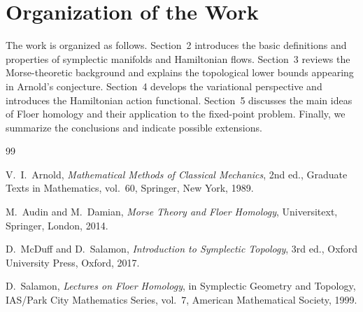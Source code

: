 \documentclass[11pt,a4paper]{article}
\theoremstyle{plain}
\theoremstyle{definition}
\theoremstyle{remark}
\begin{document}
	\section{Organization of the Work}
	
	The work is organized as follows. Section~2 introduces
	the basic definitions and properties of symplectic
	manifolds and Hamiltonian flows. Section~3 reviews the
	Morse-theoretic background and explains the topological
	lower bounds appearing in Arnold's conjecture. Section~4
	develops the variational perspective and introduces the
	Hamiltonian action functional. Section~5 discusses the
	main ideas of Floer homology and their application to
	the fixed-point problem. Finally, we summarize the
	conclusions and indicate possible extensions.
	
	\begin{thebibliography}{99}
		
		V.~I.~Arnold,
		\emph{Mathematical Methods of Classical Mechanics},
		2nd ed., Graduate Texts in Mathematics, vol.~60,
		Springer, New York, 1989.
		
		M.~Audin and M.~Damian,
		\emph{Morse Theory and Floer Homology},
		Universitext, Springer, London, 2014.
		
		D.~McDuff and D.~Salamon,
		\emph{Introduction to Symplectic Topology},
		3rd ed., Oxford University Press, Oxford, 2017.
		
		D.~Salamon,
		\emph{Lectures on Floer Homology},
		in Symplectic Geometry and Topology,
		IAS/Park City Mathematics Series, vol.~7,
		American Mathematical Society, 1999.
		
	\end{thebibliography}
	
\end{document}
